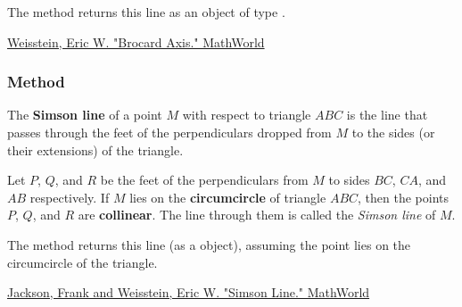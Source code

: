 The method  returns this line as an object of type .
\begin{flushright}
\small
\href{https://mathworld.wolfram.com/BrocardAxis.html}{Weisstein, Eric W. "Brocard Axis." MathWorld}
\end{flushright}

\vspace{1em}

\subsubsection{Method } %
\label{ssub:method_triangle_simson__line}

The \textbf{Simson line} of a point $M$ with respect to triangle $ABC$ is the line that passes through the feet of the perpendiculars dropped from $M$ to the sides (or their extensions) of the triangle.

\medskip

Let $P$, $Q$, and $R$ be the feet of the perpendiculars from $M$ to sides $BC$, $CA$, and $AB$ respectively. If $M$ lies on the \textbf{circumcircle} of triangle $ABC$, then the points $P$, $Q$, and $R$ are \textbf{collinear}. The line through them is called the \emph{Simson line} of $M$.

\medskip

The method  returns this line (as a  object), assuming the point  lies on the circumcircle of the triangle.
\begin{flushright}
\small
\href{https://mathworld.wolfram.com/SimsonLine.html}{Jackson, Frank and Weisstein, Eric W. "Simson Line." MathWorld}
\end{flushright}

\vspace{1em}
\begin{tkzexample}[vbox]
\begin{center}
\end{center}
\end{tkzexample}


